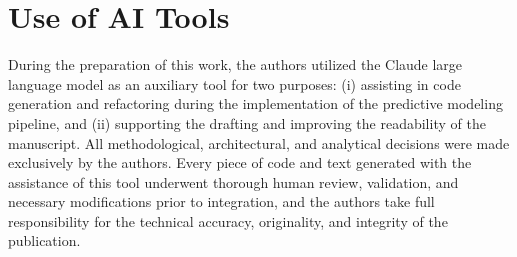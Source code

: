 \section*{Use of AI Tools}
\label{sec:ai-use}

During the preparation of this work, the authors utilized the Claude large language model \cite{anthropic2026claude} as an auxiliary tool for two purposes: (i) assisting in code generation and refactoring during the implementation of the predictive modeling pipeline, and (ii) supporting the drafting and improving the readability of the manuscript. All methodological, architectural, and analytical decisions were made exclusively by the authors. Every piece of code and text generated with the assistance of this tool underwent thorough human review, validation, and necessary modifications prior to integration, and the authors take full responsibility for the technical accuracy, originality, and integrity of the publication.



